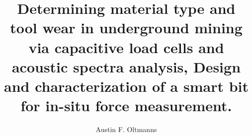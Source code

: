 \documentclass[letterpaper,10pt]{article} %
\title{
    Determining material type and tool wear in underground mining via
    capacitive load cells and acoustic spectra analysis,
    Design and characterization of a smart bit for in-situ force measurement.
    }
\author{Austin F. Oltmanns}        %
\begin{document}

\frontmatter                       %
\maketitle\newpage                 %
\makecopyright{\the\year}\newpage  %
\makesubmittal\newpage             %

\begin{abstract}

\end{abstract} \newpage


\tableofcontents\newpage        %
\listoffigures\newpage          %
\listoftables\newpage           %

\listofsymbols*                         %
\newpage

\listofabbreviations*                  %
\newpage



\begin{acknowledgments}

\end{acknowledgments} \newpage
\end{document}
